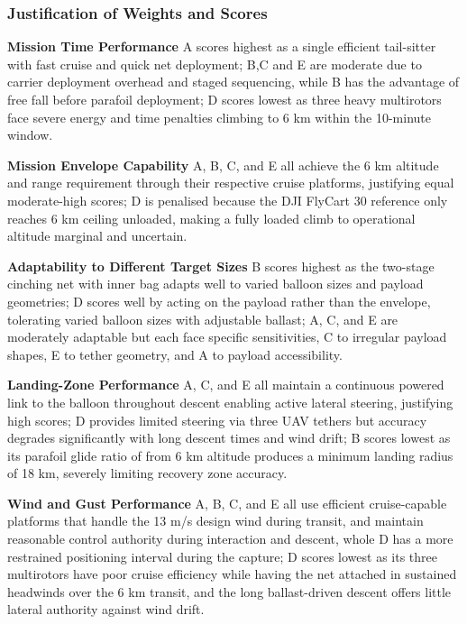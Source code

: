 \subsubsection*{Justification of Weights and Scores}
\textbf{Mission Time Performance}
A scores highest as a single efficient tail-sitter with fast cruise and quick net deployment; B,C and E are moderate due to carrier deployment overhead and staged sequencing, while B has the advantage of free fall before parafoil deployment; D scores lowest as three heavy multirotors face severe energy and time penalties climbing to 6 km within the 10-minute window. 

\textbf{Mission Envelope Capability}
A, B, C, and E all achieve the 6 km altitude and range requirement through their respective cruise platforms, justifying equal moderate-high scores; D is penalised because the DJI FlyCart 30 reference only reaches 6 km ceiling unloaded, making a fully loaded climb to operational altitude marginal and uncertain.

\textbf{Adaptability to Different Target Sizes}
 B scores highest as the two-stage cinching net with inner bag adapts well to varied balloon sizes and payload geometries; D scores well by acting on the payload rather than the envelope, tolerating varied balloon sizes with adjustable ballast; A, C, and E are moderately adaptable but each face specific sensitivities, C to irregular payload shapes, E to tether geometry, and A to payload accessibility.

\textbf{Landing-Zone Performance}
A, C, and E all maintain a continuous powered link to the balloon throughout descent enabling active lateral steering, justifying high scores; D provides limited steering via three UAV tethers but accuracy degrades significantly with long descent times and wind drift; B scores lowest as its parafoil glide ratio of from 6 km altitude produces a minimum landing radius of 18 km, severely limiting recovery zone accuracy.

\textbf{Wind and Gust Performance}
A, B, C, and E all use efficient cruise-capable platforms that handle the 13 m/s design wind during transit, and maintain reasonable control authority during interaction and descent, whole D has a more restrained positioning interval during the capture; D scores lowest as its three multirotors have poor cruise efficiency while having the net attached in sustained headwinds over the 6 km transit, and the long ballast-driven descent offers little lateral authority against wind drift.


